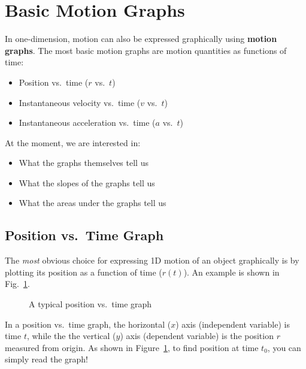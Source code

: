\section{Basic Motion Graphs}
In one-dimension, motion can 
also be expressed graphically using \textbf{motion graphs}. The most basic
motion graphs are motion quantities as functions of time:
\begin{itemize}[itemsep=3pt]
\item Position vs.\ time ($r$ vs.\ $t$)
\item Instantaneous velocity vs.\ time ($v$ vs.\ $t$)
\item Instantaneous acceleration vs.\ time ($a$ vs.\ $t$)
\end{itemize}
At the moment, we are interested in:
\begin{itemize}[itemsep=3pt]
\item What the graphs themselves tell us
\item What the slopes of the graphs tell us
\item What the areas under the graphs tell us
\end{itemize}



\subsection{Position vs.\ Time Graph}
The \emph{most} obvious choice for expressing 1D motion of an object
graphically is by plotting its position as a function of time ($r(t)$). An
example is shown in Fig.~\ref{fig:pos-time-graph}.
\begin{figure}[ht]
  \centering
  \caption{A typical position vs.\ time graph}
  \label{fig:pos-time-graph}
\end{figure}   
In a position vs.\ time graph, the horizontal ($x$) axis (independent variable)
is time $t$, while the the vertical ($y$) axis (dependent variable) is the
position $r$ measured from origin.
As shown in Figure~\ref{fig:pos-time-graph}, to find position at time $t_0$,
you can simply read the graph!




